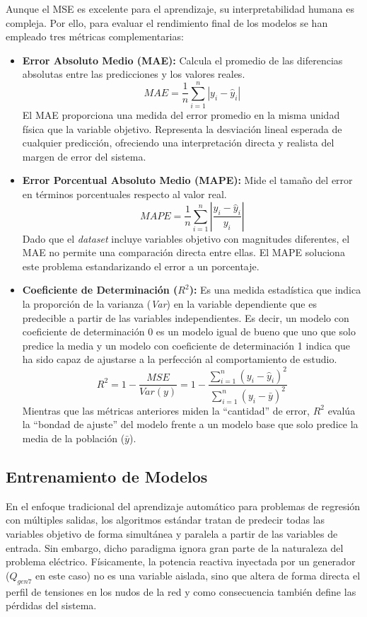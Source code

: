 Aunque el MSE es excelente para el aprendizaje, su interpretabilidad humana es compleja. Por ello, para evaluar el rendimiento final de los modelos se han empleado tres métricas complementarias:
\begin{itemize}
	\item \textbf{Error Absoluto Medio (MAE):} Calcula el promedio de las diferencias absolutas entre las predicciones y los valores reales.
	\begin{equation}
		MAE = \frac{1}{n} \sum_{i=1}^{n} |y_i - \hat{y}_i|
	\end{equation}
	El MAE proporciona una medida del error promedio en la misma unidad física que la variable objetivo. Representa la desviación lineal esperada de cualquier predicción, ofreciendo una interpretación directa y realista del margen de error del sistema.
	\item \textbf{Error Porcentual Absoluto Medio (MAPE):} Mide el tamaño del error en términos porcentuales respecto al valor real.
	\begin{equation}
		MAPE = \frac{1}{n}\sum_{i=1}^{n}\left|\frac{y_i - \hat{y}_i}{y_i}\right|
	\end{equation}
	Dado que el \textit{dataset} incluye variables objetivo con magnitudes diferentes, el MAE no permite una comparación directa entre ellas. El MAPE soluciona este problema estandarizando el error a un porcentaje.
	\item \textbf{Coeficiente de Determinación ($R^2$):} Es una medida estadística que indica la proporción de la varianza (\textit{Var}) en la variable dependiente que es predecible a partir de las variables independientes. Es decir, un modelo con coeficiente de determinación 0 es un modelo igual de bueno que uno que solo predice la media y un modelo con coeficiente de determinación 1 indica que ha sido capaz de ajustarse a la perfección al comportamiento de estudio.
	\begin{equation}
		R^2 = 1 - \frac{MSE}{\textit{Var}(y)} = 1 - \frac{\sum_{i=1}^{n}(y_i - \hat{y}_i)^2}{\sum_{i=1}^{n}(y_i - \bar{y})^2}
	\end{equation}
	Mientras que las métricas anteriores miden la ``cantidad'' de error, $R^2$ evalúa la ``bondad de ajuste'' del modelo frente a un modelo base que solo predice la media de la población ($\bar{y}$). 
\end{itemize}

\subsection{Entrenamiento de Modelos}
En el enfoque tradicional del aprendizaje automático para problemas de regresión con múltiples salidas, los algoritmos estándar tratan de predecir todas las variables objetivo de forma simultánea y paralela a partir de las variables de entrada. Sin embargo, dicho paradigma ignora gran parte de la naturaleza del problema eléctrico. Físicamente, la potencia reactiva inyectada por un generador ($Q_{gen7}$ en este caso) no es una variable aislada, sino que altera de forma directa el perfil de tensiones en los nudos de la red y como consecuencia también define las pérdidas del sistema.

